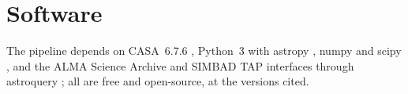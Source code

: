 \section*{Software}
The pipeline depends on CASA~6.7.6 \citep[casatools/casatasks
6.7.6-14;][]{CASA2022}, Python~3 with astropy \citep{Astropy2022}, numpy
\citep{Harris2020} and scipy \citep{Virtanen2020}, and the ALMA Science
Archive and SIMBAD TAP interfaces through astroquery \citep{Ginsburg2019};
all are free and open-source, at the versions cited.
